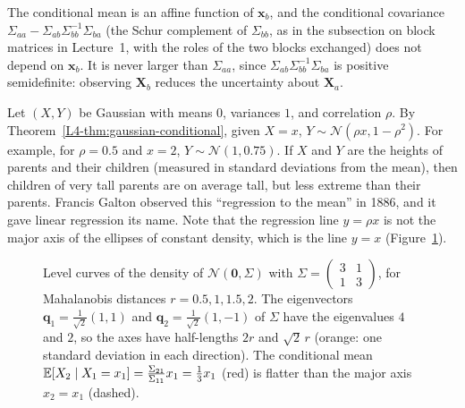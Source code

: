 The conditional mean is an affine function of $\mathbf{x}_b$, and the conditional covariance $\Sigma_{aa} - \Sigma_{ab}\Sigma_{bb}^{-1}\Sigma_{ba}$ (the Schur complement of $\Sigma_{bb}$, as in the subsection on block matrices in Lecture~1, with the roles of the two blocks exchanged) does not depend on $\mathbf{x}_b$. It is never larger than $\Sigma_{aa}$, since $\Sigma_{ab}\Sigma_{bb}^{-1}\Sigma_{ba}$ is positive semidefinite: observing $\mathbf{X}_b$ reduces the uncertainty about $\mathbf{X}_a$.

\begin{example}\label{L4-ex:regression-to-mean}
    Let $(X, Y)$ be Gaussian with means $0$, variances $1$, and correlation $\rho$. By Theorem~\ref{L4-thm:gaussian-conditional}, given $X = x$, $Y \sim \mathcal{N}(\rho x, 1 - \rho^2)$. For example, for $\rho = 0.5$ and $x = 2$, $Y \sim \mathcal{N}(1, 0.75)$. If $X$ and $Y$ are the heights of parents and their children (measured in standard deviations from the mean), then children of very tall parents are on average tall, but less extreme than their parents. Francis Galton observed this ``regression to the mean'' in 1886, and it gave linear regression its name. Note that the regression line $y = \rho x$ is not the major axis of the ellipses of constant density, which is the line $y = x$ (Figure~\ref{L4-fig:gaussian}).
\end{example}

\begin{figure}[ht]
    \centering
    \caption{Level curves of the density of $\mathcal{N}(\mathbf{0}, \Sigma)$ with $\Sigma = \left(\begin{smallmatrix} 3 & 1 \\ 1 & 3 \end{smallmatrix}\right)$, for Mahalanobis distances $r = 0.5, 1, 1.5, 2$. The eigenvectors $\mathbf{q}_1 = \frac{1}{\sqrt{2}}(1, 1)$ and $\mathbf{q}_2 = \frac{1}{\sqrt{2}}(1, -1)$ of $\Sigma$ have the eigenvalues $4$ and $2$, so the axes have half-lengths $2r$ and $\sqrt{2}\,r$ (orange: one standard deviation in each direction). The conditional mean $\mathbb{E}[X_2 \mid X_1 = x_1] = \frac{\Sigma_{21}}{\Sigma_{11}}x_1 = \frac{1}{3}x_1$ (red) is flatter than the major axis $x_2 = x_1$ (dashed).}
    \label{L4-fig:gaussian}
\end{figure}


